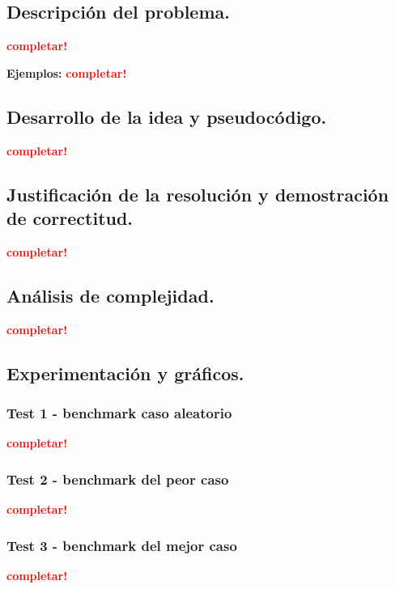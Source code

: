 \subsection{Descripción del problema.}

\vspace*{0.3cm}

\textcolor{red}{\textbf{completar!}}

\vspace*{0.5cm}

\textbf{Ejemplos:}
  \textcolor{red}{\textbf{completar!}}



\newpage
\subsection{Desarrollo de la idea y pseudocódigo.}

\vspace*{0.3cm}

\textcolor{red}{\textbf{completar!}}



\newpage
\subsection{Justificación de la resolución y demostración de correctitud.}

\vspace*{0.3cm}

\textcolor{red}{\textbf{completar!}}



\newpage
\subsection{Análisis de complejidad.}

\vspace*{0.3cm}

\textcolor{red}{\textbf{completar!}}



\newpage
\subsection{Experimentación y gráficos.}

\vspace*{0.3cm}

\subsubsection{Test 1 - benchmark caso aleatorio}

\textcolor{red}{\textbf{completar!}}


\newpage
\subsubsection{Test 2 - benchmark del peor caso}

\textcolor{red}{\textbf{completar!}}


\newpage
\subsubsection{Test 3 - benchmark del mejor caso}

\textcolor{red}{\textbf{completar!}}
